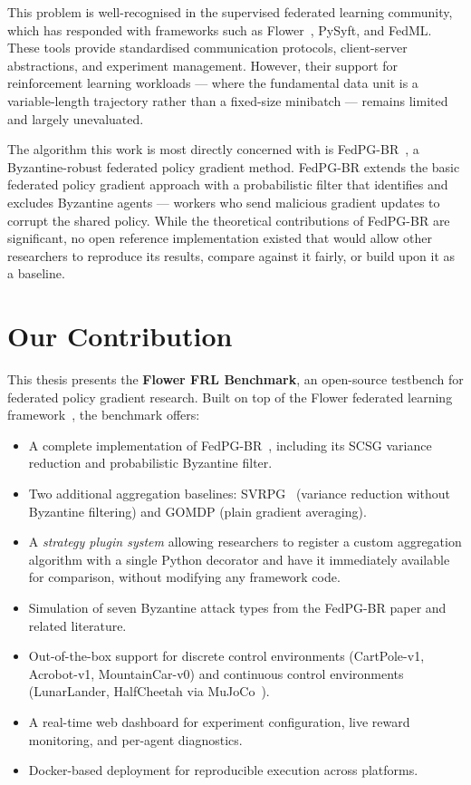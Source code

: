 This problem is well-recognised in the supervised federated learning community,
which has responded with frameworks such as Flower~\cite{beutel2020flower},
PySyft, and FedML. These tools provide standardised communication protocols,
client-server abstractions, and experiment management. However, their support for
reinforcement learning workloads --- where the fundamental data unit is a
variable-length trajectory rather than a fixed-size minibatch --- remains limited
and largely unevaluated.

The algorithm this work is most directly concerned with is
FedPG-BR~\cite{flint2023fedpgbr}, a Byzantine-robust federated policy gradient
method. FedPG-BR extends the basic federated policy gradient approach with a
probabilistic filter that identifies and excludes Byzantine agents --- workers
who send malicious gradient updates to corrupt the shared policy. While the
theoretical contributions of FedPG-BR are significant, no open reference
implementation existed that would allow other researchers to reproduce its
results, compare against it fairly, or build upon it as a baseline.

\section*{Our Contribution}

This thesis presents the \textbf{Flower FRL Benchmark}, an open-source testbench
for federated policy gradient research. Built on top of the Flower federated
learning framework~\cite{beutel2020flower}, the benchmark offers:

\begin{itemize}
    \item A complete implementation of FedPG-BR~\cite{flint2023fedpgbr},
          including its SCSG variance reduction and probabilistic Byzantine filter.
    \item Two additional aggregation baselines: SVRPG~\cite{papini2018svrpg}
          (variance reduction without Byzantine filtering) and GOMDP (plain
          gradient averaging).
    \item A \emph{strategy plugin system} allowing researchers to register a
          custom aggregation algorithm with a single Python decorator and have it
          immediately available for comparison, without modifying any framework code.
    \item Simulation of seven Byzantine attack types from the FedPG-BR paper and
          related literature.
    \item Out-of-the-box support for discrete control environments (CartPole-v1,
          Acrobot-v1, MountainCar-v0) and continuous control environments
          (LunarLander, HalfCheetah via MuJoCo~\cite{todorov2012mujoco}).
    \item A real-time web dashboard for experiment configuration, live reward
          monitoring, and per-agent diagnostics.
    \item Docker-based deployment for reproducible execution across platforms.
\end{itemize}

